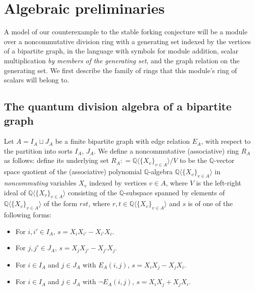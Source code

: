 \documentclass{amsart}
\theoremstyle{definition}
\theoremstyle{remark}
\numberwithin{equation}{section}
\begin{document}
\section{Algebraic preliminaries}\label{preliminaries}

A model of our counterexample to the stable forking conjecture will be a module over a noncommutative division ring with a generating set indexed by the vertices of a bipartite graph, in the language with symbols for module addition, scalar multiplication \textit{by members of the generating set}, and the graph relation on the generating set. We first describe the family of rings that this module's ring of scalars will belong to.


\subsection{The quantum division algebra of a bipartite graph}\label{quantum division algebra}


Let $A = I_{A} \sqcup J_{A}$ be a finite bipartite graph with edge relation $E_{A}$, with respect to the partition into sorts $I_{A}$, $J_{A}$. We define a noncommutative (associative) ring $R_{A}$ as follows: define its underlying set $R_{A} : = \mathbb{Q}\langle\{ X_{v} \}_{v \in A} \rangle / V$ to be the $\mathbb{Q}$-vector space quotient of the (associative) polynomial $\mathbb{Q}$-algebra $\mathbb{Q}\langle\{ X_{v} \}_{v \in A}\rangle$ in \textit{noncommuting} variables $X_{v}$ indexed by vertices $v \in A$, where $V$ is the left-right ideal of $\mathbb{Q}\langle\{ X_{v} \}_{v \in A} \rangle $ consisting of the $\mathbb{Q}$-subspace spanned by elements of $\mathbb{Q}\langle\{ X_{v} \}_{v \in A} \rangle $ of the form $r s t $, where $r, t \in \mathbb{Q}\langle\{ X_{v} \}_{v \in A} \rangle $ and $s$ is of one of the following forms:

\begin{itemize}
    \item For $i, i' \in I_{A}$, $s = X_{i}X_{i'}-X_{i'}X_{i}$.
    
    \item For $j, j' \in J_{A}$, $s = X_{j}X_{j'}-X_{j'}X_{j}$.

    \item For $i \in I_{A}$ and $j \in J_{A}$ with $ E_{A}(i, j)$, $s = X_{i}X_{j} - X_{j}X_{i}$.

    \item For $i \in I_{A}$ and $j \in J_{A}$ with $ \neg E_{A}(i, j)$, $s = X_{i}X_{j} + X_{j}X_{i}$.
\end{itemize}
\end{document}

